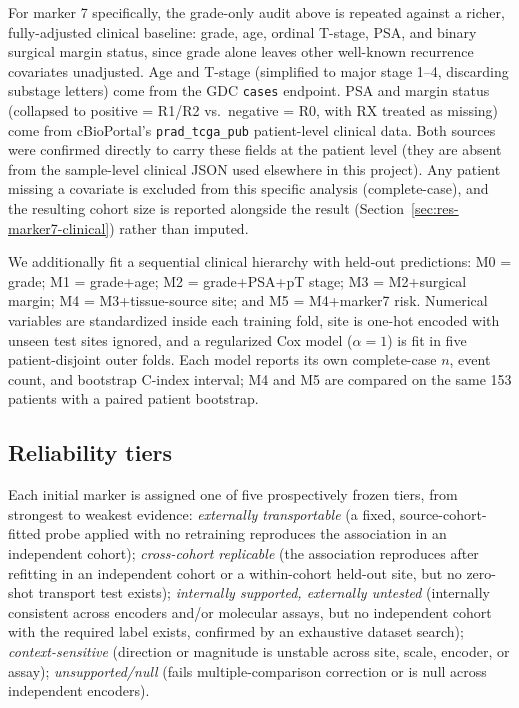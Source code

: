 For marker 7 specifically, the grade-only audit above is repeated against a richer,
fully-adjusted clinical baseline: grade, age, ordinal T-stage, PSA, and binary surgical margin
status, since grade alone leaves other well-known recurrence covariates unadjusted. Age and
T-stage (simplified to major stage 1--4, discarding substage letters) come from the GDC
\texttt{cases} endpoint. PSA and margin status (collapsed to positive = R1/R2 vs.\ negative =
R0, with RX treated as missing) come from cBioPortal's \texttt{prad\_tcga\_pub} patient-level
clinical data. Both sources were confirmed directly to carry these fields at the patient level
(they are absent from the sample-level clinical JSON used elsewhere in this project). Any
patient missing a covariate is excluded from this specific analysis (complete-case), and the
resulting cohort size is reported alongside the result
(Section~\ref{sec:res-marker7-clinical}) rather than imputed.

We additionally fit a sequential clinical hierarchy with held-out predictions: M0 = grade;
M1 = grade+age; M2 = grade+PSA+pT stage; M3 = M2+surgical margin; M4 = M3+tissue-source
site; and M5 = M4+marker7 risk. Numerical variables are standardized inside each training
fold, site is one-hot encoded with unseen test sites ignored, and a regularized Cox model
($\alpha=1$) is fit in five patient-disjoint outer folds. Each model reports its own
complete-case $n$, event count, and bootstrap C-index interval; M4 and M5 are compared on the
same 153 patients with a paired patient bootstrap.

\subsection{Reliability tiers}

Each initial marker is assigned one of five prospectively frozen tiers, from strongest to weakest evidence:
\emph{externally transportable} (a fixed, source-cohort-fitted probe applied with no retraining
reproduces the association in an independent cohort); \emph{cross-cohort replicable} (the
association reproduces after refitting in an independent cohort or a within-cohort held-out
site, but no zero-shot transport test exists); \emph{internally supported, externally
untested} (internally consistent across encoders and/or molecular assays, but no independent
cohort with the required label exists, confirmed by an exhaustive dataset search);
\emph{context-sensitive} (direction or magnitude is unstable across site, scale, encoder, or
assay); \emph{unsupported/null} (fails multiple-comparison correction or is null across
independent encoders).

